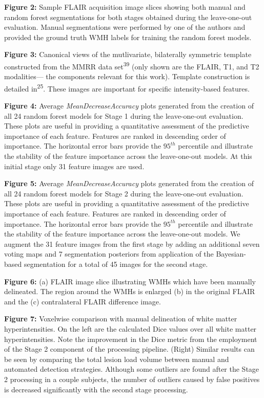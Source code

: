 \documentclass[11pt,]{article}
\begin{document}
\textbf{Figure 2:} Sample FLAIR acquisition image slices showing both
manual and random forest segmentations for both stages obtained during
the leave-one-out evaluation. Manual segmentations were performed by one
of the authors and provided the ground truth WMH labels for training the
random forest models.

\textbf{Figure 3:} Canonical views of the mutlivariate, bilaterally
symmetric template constructed from the MMRR data
set\textsuperscript{39} (only shown are the FLAIR, T1, and T2
modalities--- the components relevant for this work). Template
construction is detailed in\textsuperscript{25}. These images are
important for specific intensity-based features.

\textbf{Figure 4:} Average \emph{MeanDecreaseAccuracy} plots generated
from the creation of all 24 random forest models for Stage 1 during the
leave-one-out evaluation. These plots are useful in providing a
quantitative assessment of the predictive importance of each feature.
Features are ranked in descending order of importance. The horizontal
error bars provide the \(95^{th}\) percentile and illustrate the
stability of the feature importance across the leave-one-out models. At
this initial stage only 31 feature images are used.

\textbf{Figure 5:} Average \emph{MeanDecreaseAccuracy} plots generated
from the creation of all 24 random forest models for Stage 2 during the
leave-one-out evaluation. These plots are useful in providing a
quantitative assessment of the predictive importance of each feature.
Features are ranked in descending order of importance. The horizontal
error bars provide the \(95^{th}\) percentile and illustrate the
stability of the feature importance across the leave-one-out models. We
augment the 31 feature images from the first stage by adding an
additional seven voting maps and 7 segmentation posteriors from
application of the Bayesian-based segmentation for a total of 45 images
for the second stage.

\textbf{Figure 6:} (a) FLAIR image slice illustrating WMHs which have
been manually delineated. The region around the WMHs is enlarged (b) in
the original FLAIR and the (c) contralateral FLAIR difference image.

\textbf{Figure 7:} Voxelwise comparison with manual delineation of white
matter hyperintensities. On the left are the calculated Dice values over
all white matter hyperintensities. Note the improvement in the Dice
metric from the employment of the Stage 2 component of the processing
pipeline. (Right) Similar results can be seen by comparing the total
lesion load volume between manual and automated detection strategies.
Although some outliers are found after the Stage 2 processing in a
couple subjects, the number of outliers caused by false positives is
decreased significantly with the second stage processing.
\end{document}
